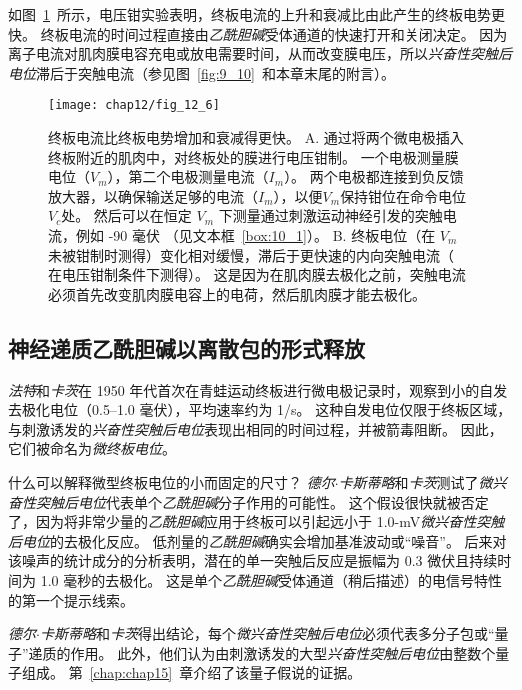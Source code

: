 如图~\ref{fig:12_6}~所示，电压钳实验表明，终板电流的上升和衰减比由此产生的终板电势更快。
终板电流的时间过程直接由\textit{乙酰胆碱}受体通道的快速打开和关闭决定。
因为离子电流对肌肉膜电容充电或放电需要时间，从而改变膜电压，所以\textit{兴奋性突触后电位}滞后于突触电流（参见图~\ref{fig:9_10}~和本章末尾的附言）。


\begin{figure}[htbp]
	\centering
	\texttt{[image: chap12/fig\_12\_6]}
	\caption{终板电流比终板电势增加和衰减得更快。
		A. 通过将两个微电极插入终板附近的肌肉中，对终板处的膜进行电压钳制。
		一个电极测量膜电位（$V_m$），第二个电极测量电流（$I_m$）。
		两个电极都连接到负反馈放大器，以确保输送足够的电流（$I_m$），以便$V_m$保持钳位在命令电位 $V_c$处。
		然后可以在恒定 $V_m$ 下测量通过刺激运动神经引发的突触电流，例如 -90 毫伏 （见文本框~\ref{box:10_1}）。
		B. 终板电位（在 $V_m$ 未被钳制时测得）变化相对缓慢，滞后于更快速的内向突触电流（ 在电压钳制条件下测得）。
		这是因为在肌肉膜去极化之前，突触电流必须首先改变肌肉膜电容上的电荷，然后肌肉膜才能去极化。}
	\label{fig:12_6}
\end{figure}



\subsection{神经递质乙酰胆碱以离散包的形式释放}

\textit{法特}和\textit{卡茨}在 1950 年代首次在青蛙运动终板进行微电极记录时，观察到小的自发去极化电位（0.5–1.0 毫伏），平均速率约为 1/s。 
这种自发电位仅限于终板区域，与刺激诱发的\textit{兴奋性突触后电位}表现出相同的时间过程，并被箭毒阻断。 
因此，它们被命名为\textit{微终板电位}。


什么可以解释微型终板电位的小而固定的尺寸？ 
\textit{德尔$\cdot$卡斯蒂略}和\textit{卡茨}测试了\textit{微兴奋性突触后电位}代表单个\textit{乙酰胆碱}分子作用的可能性。
这个假设很快就被否定了，因为将非常少量的\textit{乙酰胆碱}应用于终板可以引起远小于 1.0-mV\textit{微兴奋性突触后电位}的去极化反应。 
低剂量的\textit{乙酰胆碱}确实会增加基准波动或“噪音”。 
后来对该噪声的统计成分的分析表明，潜在的单一突触后反应是振幅为 0.3 微伏且持续时间为 1.0 毫秒的去极化。 
这是单个\textit{乙酰胆碱}受体通道（稍后描述）的电信号特性的第一个提示线索。


\textit{德尔$\cdot$卡斯蒂略}和\textit{卡茨}得出结论，每个\textit{微兴奋性突触后电位}必须代表多分子包或“量子”递质的作用。 
此外，他们认为由刺激诱发的大型\textit{兴奋性突触后电位}由整数个量子组成。 
第~\ref{chap:chap15}~章介绍了该量子假说的证据。



